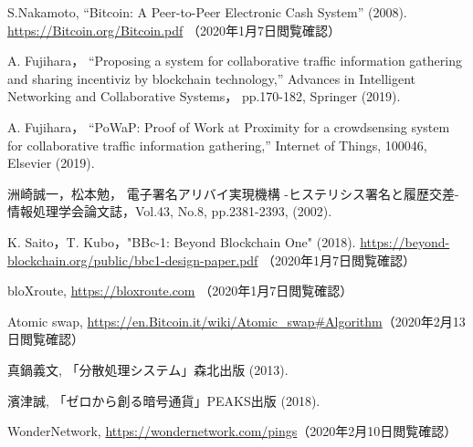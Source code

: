 \documentclass[a4paper,12pt]{jsarticle}
\begin{document}
\begin{thebibliography}{99}
S.Nakamoto,
``Bitcoin: A Peer-to-Peer Electronic Cash System'' (2008).
\url {https://Bitcoin.org/Bitcoin.pdf} （2020年1月7日閲覧確認）

A. Fujihara，
``Proposing a system for collaborative traffic information gathering 
and sharing incentiviz by blockchain technology,''
Advances in Intelligent Networking and Collaborative Systems，
pp.170-182, Springer (2019).

A. Fujihara，
``PoWaP: Proof of Work at Proximity for a crowdsensing system for 
collaborative traffic information gathering,'' 
Internet of Things, 100046, Elsevier (2019).

洲崎誠一，松本勉，
電子署名アリバイ実現機構 -ヒステリシス署名と履歴交差-
情報処理学会論文誌，Vol.43, No.8, pp.2381-2393, (2002).

K. Saito，T. Kubo，"BBc-1: Beyond Blockchain One" (2018).
\url{https://beyond-blockchain.org/public/bbc1-design-paper.pdf} （2020年1月7日閲覧確認）

bloXroute, \url{https://bloxroute.com} （2020年1月7日閲覧確認）

Atomic swap, \url{https://en.Bitcoin.it/wiki/Atomic_swap#Algorithm}（2020年2月13日閲覧確認）

真鍋義文, 「分散処理システム」森北出版 (2013).

濱津誠, 「ゼロから創る暗号通貨」PEAKS出版 (2018).

WonderNetwork, \url{https://wondernetwork.com/pings}（2020年2月10日閲覧確認）



\end{thebibliography} 





\newpage
\appendix
\def\thesection{付録}
\end{document}

